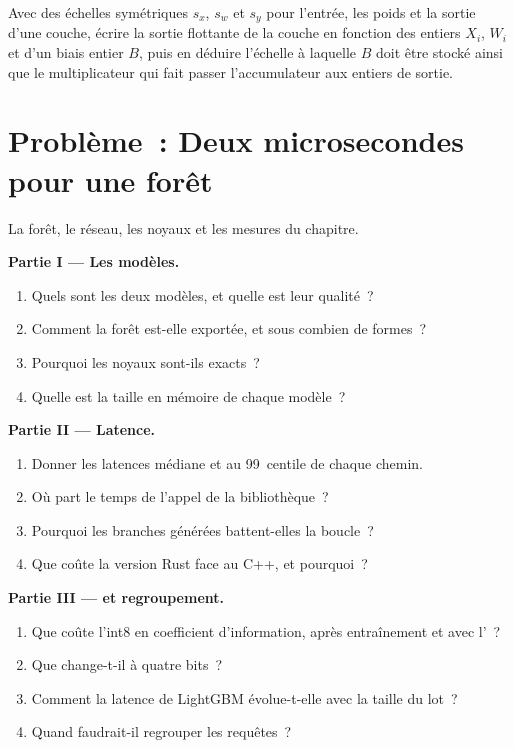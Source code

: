 \begin{exercise}[$\star\star\star$]\label{exo:ml:low-latency-inference:8}
Avec des échelles symétriques $s_x$, $s_w$ et $s_y$ pour l'entrée, les poids et la sortie d'une couche, écrire la sortie flottante de la couche
en fonction des entiers $X_i$, $W_i$ et d'un biais entier $B$, puis en déduire l'échelle à laquelle $B$ doit être stocké ainsi que le multiplicateur qui fait passer
l'accumulateur aux entiers de sortie.
\end{exercise}

\section{Problème~: Deux microsecondes pour une forêt}

\begin{problem}\label{pb:ml:low-latency-inference:1}
La forêt, le réseau, les noyaux et les mesures du chapitre.

\medskip\noindent\textbf{Partie I --- Les modèles.}
\begin{enumerate}
\item Quels sont les deux modèles, et quelle est leur qualité~?
\item Comment la forêt est-elle exportée, et sous combien de formes~?
\item Pourquoi les noyaux sont-ils exacts~?
\item Quelle est la taille en mémoire de chaque modèle~?
\end{enumerate}

\medskip\noindent\textbf{Partie II --- Latence.}
\begin{enumerate}[resume]
\item Donner les latences médiane et au 99~centile de chaque chemin.
\item Où part le temps de l'appel de la bibliothèque~?
\item Pourquoi les branches générées battent-elles la boucle~?
\item Que coûte la version Rust face au C++, et pourquoi~?
\end{enumerate}

\medskip\noindent\textbf{Partie III ---  et regroupement.}
\begin{enumerate}[resume]
\item Que coûte l'int8 en coefficient d'information, après entraînement et avec l'~?
\item Que change-t-il à quatre bits~?
\item Comment la latence de LightGBM évolue-t-elle avec la taille du lot~?
\item Quand faudrait-il regrouper les requêtes~?
\end{enumerate}


\end{problem}
